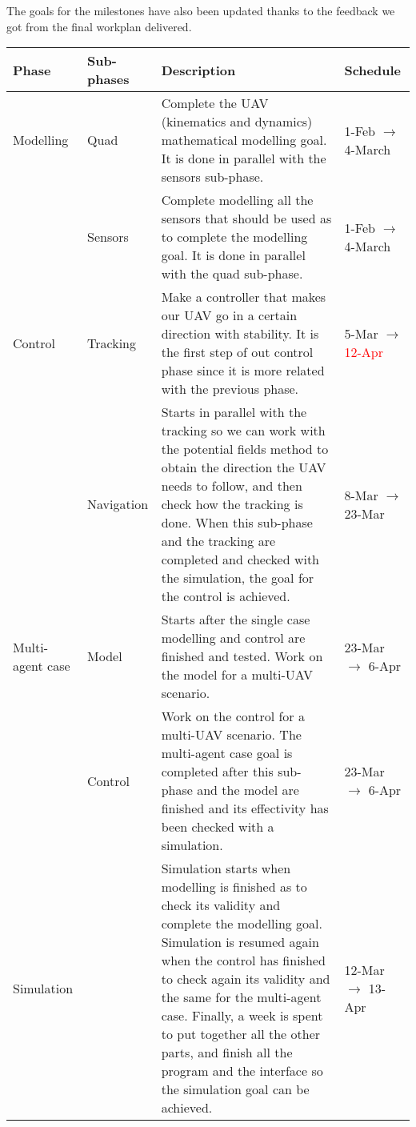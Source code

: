 \documentclass{article}
\begin{document}
The goals for the milestones have also been updated thanks to the feedback we got from the final workplan delivered.
	\begin{center}
	\begin{tabular}[H]{|C{2cm}|C{2cm}|C{7cm}|C{3cm}|} \hline
		Phase & Sub-phases & Description & Schedule\\ \hline
		Modelling & Quad & Complete the UAV (kinematics and dynamics) mathematical modelling goal. It is done in parallel with the sensors sub-phase. &  1-Feb $\rightarrow$ 4-March  \\ 
		& Sensors & Complete modelling all the sensors that should be used as to complete the modelling goal. It is done in parallel with the quad sub-phase. & 1-Feb $\rightarrow$ 4-March \\ \hline
		
		Control & Tracking & Make a controller that makes our UAV go in a certain direction with stability. It is the first step of out control phase since it is more related with the previous phase. &  5-Mar $\rightarrow$ \textcolor{red}{12-Apr}\\ 
		&Navigation & Starts in parallel with the tracking so we can work with the potential fields method to obtain the direction the UAV needs to follow, and then check how the tracking is done. When this sub-phase and the tracking are completed and checked with the simulation, the goal for the control is achieved. & 8-Mar $\rightarrow$ 23-Mar \\ \hline
		
		Multi-agent case & Model & Starts after the single case modelling and control are finished and tested. Work on the model for a multi-UAV scenario. & 23-Mar $\rightarrow$ 6-Apr\\ 
		&Control & Work on the control for a multi-UAV scenario. The multi-agent case goal is completed after this sub-phase and the model are finished and its effectivity has been checked with a simulation. & 23-Mar $\rightarrow$ 6-Apr \\ \hline
		
		Simulation & & Simulation starts when modelling is finished as to check its validity and complete the modelling goal. Simulation is resumed again when the control has finished to check again its validity and the same for the multi-agent case. Finally, a week is spent to put together all the other parts, and finish all the program and the interface so the simulation goal can be achieved. & 12-Mar $\rightarrow$ 13-Apr \\ \hline
		

\end{tabular}
\end{center}
\end{document}
